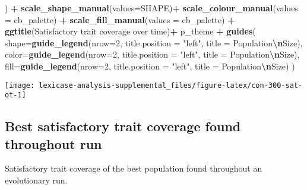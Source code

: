 \documentclass[
]{book}
\newenvironment{Shaded}{\begin{snugshade}}{\end{snugshade}}
\newcommand{\AttributeTok}[1]{\textcolor[rgb]{0.13,0.29,0.53}{#1}}
\newcommand{\DecValTok}[1]{\textcolor[rgb]{0.00,0.00,0.81}{#1}}
\newcommand{\FunctionTok}[1]{\textcolor[rgb]{0.13,0.29,0.53}{\textbf{#1}}}
\newcommand{\NormalTok}[1]{#1}
\newcommand{\SpecialCharTok}[1]{\textcolor[rgb]{0.81,0.36,0.00}{\textbf{#1}}}
\newcommand{\StringTok}[1]{\textcolor[rgb]{0.31,0.60,0.02}{#1}}
\begin{document}
\begin{Shaded}
\begin{Highlighting}[]
\NormalTok{  ) }\SpecialCharTok{+}
  \FunctionTok{scale\_shape\_manual}\NormalTok{(}\AttributeTok{values=}\NormalTok{SHAPE)}\SpecialCharTok{+}
  \FunctionTok{scale\_colour\_manual}\NormalTok{(}\AttributeTok{values =}\NormalTok{ cb\_palette) }\SpecialCharTok{+}
  \FunctionTok{scale\_fill\_manual}\NormalTok{(}\AttributeTok{values =}\NormalTok{ cb\_palette) }\SpecialCharTok{+}
  \FunctionTok{ggtitle}\NormalTok{(}\StringTok{\textquotesingle{}Satisfactory trait coverage over time\textquotesingle{}}\NormalTok{)}\SpecialCharTok{+}
\NormalTok{  p\_theme }\SpecialCharTok{+}
  \FunctionTok{guides}\NormalTok{(}
    \AttributeTok{shape=}\FunctionTok{guide\_legend}\NormalTok{(}\AttributeTok{nrow=}\DecValTok{2}\NormalTok{, }\AttributeTok{title.position =} \StringTok{"left"}\NormalTok{, }\AttributeTok{title =} \StringTok{\textquotesingle{}Population}\SpecialCharTok{\textbackslash{}n}\StringTok{Size\textquotesingle{}}\NormalTok{),}
    \AttributeTok{color=}\FunctionTok{guide\_legend}\NormalTok{(}\AttributeTok{nrow=}\DecValTok{2}\NormalTok{, }\AttributeTok{title.position =} \StringTok{"left"}\NormalTok{, }\AttributeTok{title =} \StringTok{\textquotesingle{}Population}\SpecialCharTok{\textbackslash{}n}\StringTok{Size\textquotesingle{}}\NormalTok{),}
    \AttributeTok{fill=}\FunctionTok{guide\_legend}\NormalTok{(}\AttributeTok{nrow=}\DecValTok{2}\NormalTok{, }\AttributeTok{title.position =} \StringTok{"left"}\NormalTok{, }\AttributeTok{title =} \StringTok{\textquotesingle{}Population}\SpecialCharTok{\textbackslash{}n}\StringTok{Size\textquotesingle{}}\NormalTok{)}
\NormalTok{  )}
\end{Highlighting}
\end{Shaded}

\texttt{[image: lexicase-analysis-supplemental\_files/figure-latex/con-300-sat-ot-1]}

\hypertarget{best-satisfactory-trait-coverage-found-throughout-run-3}{%
\subsection{Best satisfactory trait coverage found throughout run}\label{best-satisfactory-trait-coverage-found-throughout-run-3}}

Satisfactory trait coverage of the best population found throughout an evolutionary run.
\end{document}
